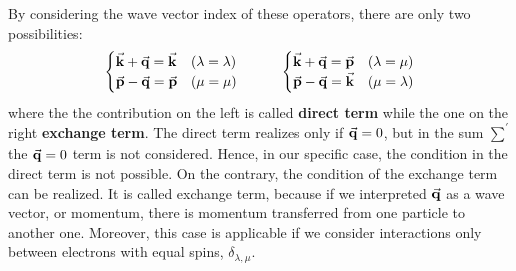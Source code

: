 \documentclass[../main/main.tex]{subfiles}
\begin{document}
By considering the wave vector index of these operators, there are only two possibilities:
\begin{equation*}
  \begin{cases}
   \va{k}+\va{q} = \va{k} &(\lambda = \lambda )\\
   \va{p}-\va{q} = \va{p} &(\mu = \mu )
  \end{cases}
  \quad \quad \quad
  \begin{cases}
   \va{k}+\va{q} = \va{p} & (\lambda = \mu )\\
   \va{p}-\va{q} = \va{k} & (\mu = \lambda )
  \end{cases}
\end{equation*}
where the the contribution on the left is called \textbf{direct term} while the one on the right \textbf{exchange term}. 
The direct term realizes only if  \( \va{q}=0 \), but  in the sum \( \sum_{}^{'}   \) the \( \va{q}=0 \) term is not considered. Hence, in our specific case, the condition in the direct term is not possible. 
On the contrary, the condition of the exchange term can be realized. It is called exchange term, because if we interpreted \( \va{q} \) as a wave vector, or momentum, there is momentum transferred from one particle to another one. Moreover, this case is applicable if we consider interactions only between electrons with equal spins, \( \delta _{\lambda , \mu } \).
\end{document}
